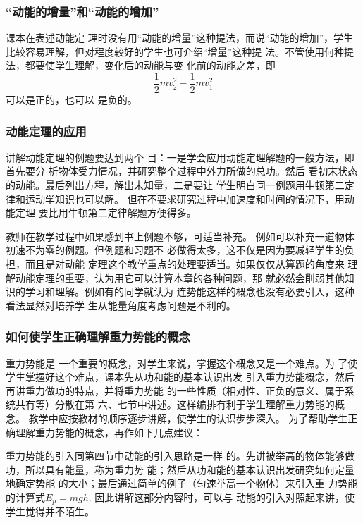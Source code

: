 \subsubsection{“动能的增量”和“动能的增加”}

课本在表述动能定
理时没有用“动能的增量”这种提法，而说“动能的增加”，学生
比较容易理解，但对程度较好的学生也可介绍“增量”这种提
法。不管使用何种提法，都要使学生理解，变化后的动能与变
化前的动能之差，即
\[\frac{1}{2}mv^2_2-\frac{1}{2}mv^2_1\]
可以是正的，也可以
是负的。

\subsubsection{动能定理的应用}

讲解动能定理的例题要达到两个
目：一是学会应用动能定理解题的一般方法，即首先要分
析物体受力情况，并研究整个过程中外力所做的总功。然后
看初末状态的动能。最后列出方程，解出未知量，二是要让
学生明白同一例题用牛顿第二定律和运动学知识也可以解。
但在不要求研究过程中加速度和时间的情况下，用动能定理
要比用牛顿第二定律解题方便得多。

教师在教学过程中如果感到书上例题不够，可适当补充。
例如可以补充一道物体初速不为零的例题。但例题和习题不
必做得太多，这不仅是因为要减轻学生的负担，而且是对动能
定理这个教学重点的处理要适当。如果仅仅从算题的角度来
理解动能定理的重要，认为用它可以计算本章的各种问题，那
就必然会削弱其他知识的学习和理解。例如有的同学就认为
连势能这样的概念也没有必要引入，这种看法显然对培养学
生从能量角度考虑问题是不利的。


\subsubsection{如何使学生正确理解重力势能的概念}

重力势能是
一个重要的概念，对学生来说，掌握这个概念又是一个难点。为
了使学生掌握好这个难点，课本先从功和能的基本认识出发
引入重力势能概念，然后再讲重力做功的特点，并将重力势能
的一些性质（相对性、正负的意义、属于系统共有等）分散在第
六、七节中讲述。这样编排有利于学生理解重力势能的概念。
教学中应按教材的顺序逐步讲解，使学生的认识步步深入。
为了帮助学生正确理解重力势能的概念，再作如下几点建议：
 
重力势能的引入同第四节中动能的引入思路是一样
的。先讲被举高的物体能够做功，所以具有能量，称为重力势
能；然后从功和能的基本认识出发研究如何定量地确定势能
的大小；最后通过简单的例子（匀速举高一个物体）来引入重
力势能的计算式$E_p=mgh$. 因此讲解这部分内容时，可以与
动能的引入对照起来讲，使学生觉得并不陌生。

